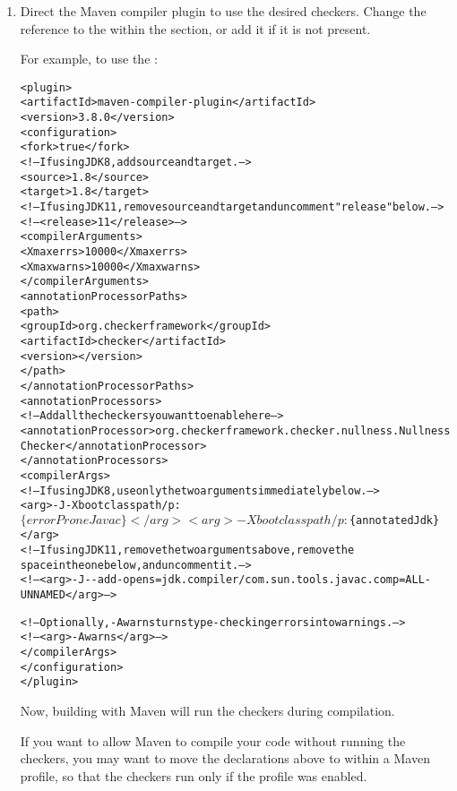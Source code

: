 \begin{enumerate}
\item Direct the Maven compiler plugin to use the desired checkers.
Change the reference to the  within the 
section, or add it if it is not present.

For example, to use the :

\begin{mysmall}
\begin{alltt}
  <plugin>
    <artifactId>maven-compiler-plugin</artifactId>
    <version>3.8.0</version>
    <configuration>
      <fork>true</fork>
      <!-- If using JDK 8, add source and target. -->
      <source>1.8</source>
      <target>1.8</target>
      <!-- If using JDK 11, remove source and target and uncomment "release" below. -->
      <!-- <release>11</release> -->
      <compilerArguments>
        <Xmaxerrs>10000</Xmaxerrs>
        <Xmaxwarns>10000</Xmaxwarns>
      </compilerArguments>
      <annotationProcessorPaths>
        <path>
          <groupId>org.checkerframework</groupId>
          <artifactId>checker</artifactId>
          <version>\ReleaseVersion{}</version>
        </path>
      </annotationProcessorPaths>
      <annotationProcessors>
        <!-- Add all the checkers you want to enable here -->
        <annotationProcessor>org.checkerframework.checker.nullness.NullnessChecker</annotationProcessor>
      </annotationProcessors>
      <compilerArgs>
        <!-- If using JDK 8, use only the two arguments immediately below. -->
        <arg>-J-Xbootclasspath/p:$\{errorProneJavac\}</arg>
        <arg>-Xbootclasspath/p:$\{annotatedJdk\}</arg>
        <!-- If using JDK 11, remove the two arguments above, remove the
             space in the one below, and uncomment it. -->
        <!-- <arg>-J- -add-opens=jdk.compiler/com.sun.tools.javac.comp=ALL-UNNAMED</arg> -->

        <!-- Optionally, -Awarns turns type-checking errors into warnings. -->
        <!-- <arg>-Awarns</arg> -->
      </compilerArgs>
    </configuration>
  </plugin>
\end{alltt}
\end{mysmall}

Now, building with Maven will run the checkers during compilation.

If you want to allow Maven to compile your code without running the
checkers, you may want to move the declarations above to within a Maven
profile, so that the checkers run only if the profile was enabled.

\end{enumerate}


